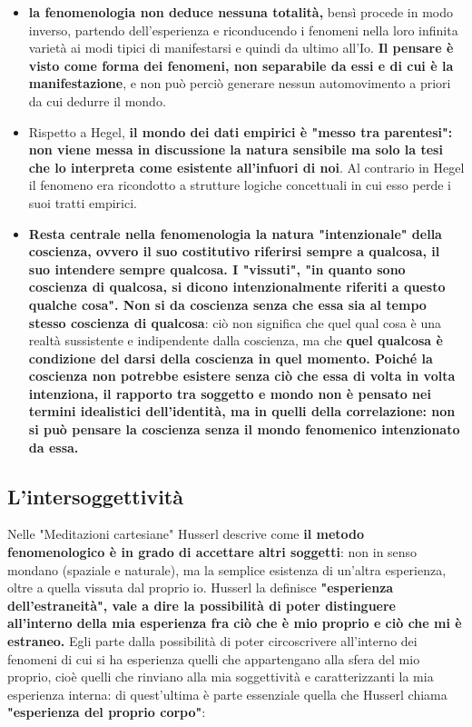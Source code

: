 \begin{itemize}


\item \textbf{la fenomenologia non deduce nessuna totalità,}
bensì procede in modo inverso, partendo dell'esperienza e riconducendo i fenomeni nella loro
infinita varietà ai modi tipici di manifestarsi
e quindi da ultimo all'Io. \textbf{Il pensare è
visto come forma dei fenomeni, non separabile
da essi e di cui è la manifestazione}, e non
può perciò generare nessun automovimento
a priori da cui dedurre il mondo.

\item  Rispetto a Hegel, \textbf{il mondo dei dati empirici
è "messo tra parentesi": non viene messa in
discussione la natura sensibile ma solo la tesi
che lo interpreta come esistente all'infuori
di noi}. Al contrario in Hegel il fenomeno
era ricondotto a strutture logiche concettuali
in cui esso perde i suoi tratti empirici.

\item  \textbf{Resta centrale nella fenomenologia la
natura "intenzionale" della coscienza, ovvero
il suo costitutivo riferirsi sempre a qualcosa,
il suo intendere sempre qualcosa. I "vissuti",
"in quanto sono coscienza di qualcosa, si
dicono intenzionalmente riferiti a questo
qualche cosa". Non si da coscienza senza
che essa sia al tempo stesso coscienza di
qualcosa}: ciò non significa che quel qual cosa
è una realtà sussistente e indipendente dalla
coscienza, ma che \textbf{quel qualcosa è condizione del
darsi della coscienza in quel momento. Poiché la
coscienza non potrebbe esistere senza ciò che
essa di volta in volta intenziona, il rapporto
tra soggetto e mondo non è pensato nei termini
idealistici dell'identità, ma in quelli della
correlazione: non si può pensare la coscienza
senza il mondo fenomenico intenzionato da
essa.}

\end{itemize}

\subsection{L'intersoggettività}

Nelle "Meditazioni cartesiane" Husserl descrive come
\textbf{il metodo fenomenologico è in grado di accettare
altri soggetti}: non in senso mondano (spaziale e
naturale), ma la semplice esistenza di un'altra
esperienza, oltre a quella vissuta dal proprio io.
Husserl la definisce \textbf{"esperienza dell'estraneità",
vale a dire la possibilità di poter distinguere all'interno
della mia esperienza fra ciò che è mio proprio e ciò
che mi è estraneo.}
Egli parte dalla possibilità di poter circoscrivere
all'interno dei fenomeni di cui si ha esperienza quelli
che appartengano alla sfera del mio proprio, cioè
quelli che rinviano alla mia soggettività e
caratterizzanti la mia esperienza interna:
di quest'ultima è parte essenziale quella che
Husserl chiama \textbf{"esperienza del proprio corpo"}:

